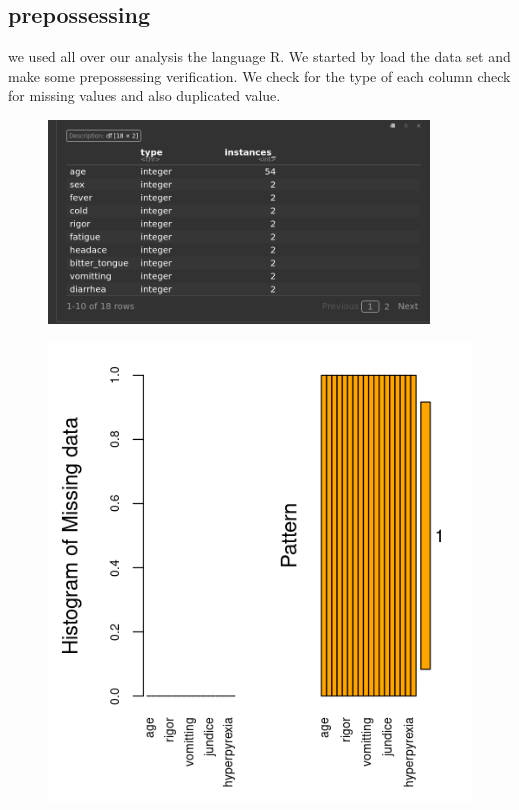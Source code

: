 \documentclass[12pt,a4paper]{article}
\begin{document}
\subsection{prepossessing}
we used all over our analysis the language R. We started by load the data set and make some prepossessing verification. We check for the type of each column check for missing values and also duplicated value.
\begin{figure}[H]
	\centering
	\includegraphics[width=0.9\textwidth, height=0.28\textheight]{Figures/dataType.png}
	\label{fig:code}
\end{figure}

\begin{figure}[H]
	\centering
	\includegraphics[width=.9\textwidth, height=0.30\textheight]{Figures/missing.png}
	\label{fig:code}
\end{figure}
\end{document}
